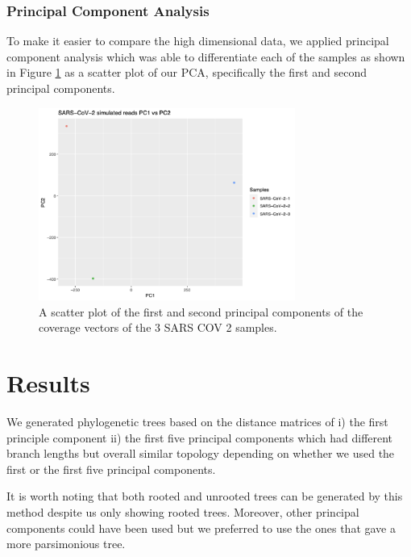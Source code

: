 \documentclass[10pt, a4paper]{article}
\begin{document}
\newpage
\subsubsection{Principal Component Analysis}
\label{sec:orgcc5fc04}
To make it easier to compare the high dimensional data, we applied principal 
component analysis which was able to differentiate each of the samples as shown
in Figure \ref{fig:org612f505} as a scatter plot of our PCA, specifically the first and 
second principal components.

\begin{figure}[h]
\centering
\includegraphics[width=0.75\textwidth]{../Figures/SARS_CoV_2/PCA.png}
\caption[SARS-CoV-2 PCA]{\label{fig:org612f505}
A scatter plot of the first and second principal components of the coverage vectors of the 3 SARS COV 2 samples.}
\end{figure}

\clearpage
\section{Results}
\label{sec:org1179550}
We generated phylogenetic trees based on the distance matrices of i) the first 
principle component ii) the first five principal components which had different 
branch lengths but overall similar topology depending on whether we used the 
first or the first five principal components. 

It is worth noting that both rooted and unrooted trees can be generated by this
method despite us only showing rooted trees. Moreover, other principal
components could have been used but we preferred to use the ones that gave a 
more parsimonious tree.


\end{document}
